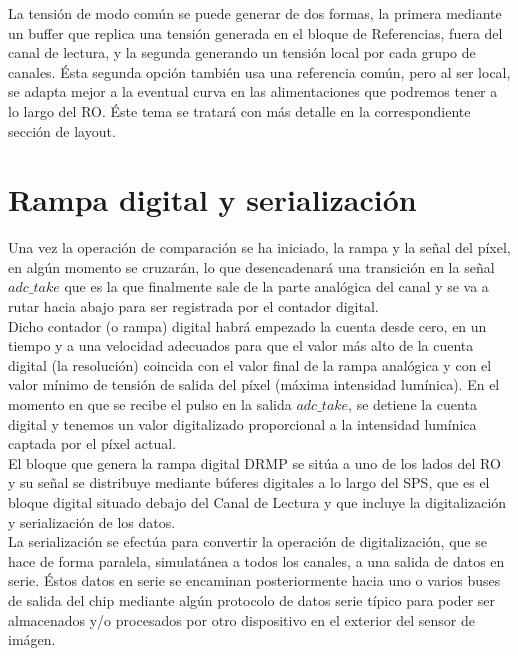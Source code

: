 La tensión de modo común se puede generar de dos formas, la primera mediante un
buffer que replica una tensión generada en el bloque de Referencias, fuera del
canal de lectura, y la segunda generando un tensión local por cada grupo de canales.
Ésta segunda opción también usa una referencia común, pero al ser local, se adapta
mejor a la eventual curva en las alimentaciones que podremos tener a lo largo
del RO. Éste tema se tratará con más detalle en la correspondiente sección de layout.\\

\section{Rampa digital y serialización}

Una vez la operación de comparación se ha iniciado, la rampa y la señal del píxel,
en algún momento se cruzarán, lo que desencadenará una transición en la señal
$adc\_take$ que es la que finalmente sale de la parte analógica del canal y se va
a rutar hacia abajo para ser registrada por el contador digital.\\

Dicho contador (o rampa) digital habrá empezado la cuenta desde cero, en un tiempo y a una
velocidad adecuados para que el valor más alto de la cuenta digital (la resolución)
coincida con el valor final de la rampa analógica y con el valor mínimo de tensión
de salida del píxel (máxima intensidad lumínica). En el momento en que se recibe
el pulso en la salida $adc\_take$, se detiene la cuenta digital y tenemos un valor
digitalizado proporcional a la intensidad lumínica captada por el píxel actual.\\

El bloque que genera la rampa digital DRMP se sitúa a uno de los lados del RO y
su señal se distribuye mediante búferes digitales a lo largo del SPS, que es
el bloque digital situado debajo del Canal de Lectura y que incluye la digitalización
y serialización de los datos.\\

La serialización se efectúa para convertir la operación de digitalización, que se
hace de forma paralela, simulatánea a todos los canales, a una salida de datos en serie.
Éstos datos en serie se encaminan posteriormente hacia uno o varios buses de salida
del chip mediante algún protocolo de datos serie típico para poder ser almacenados
y/o procesados por otro dispositivo en el exterior del sensor de imágen.\\
